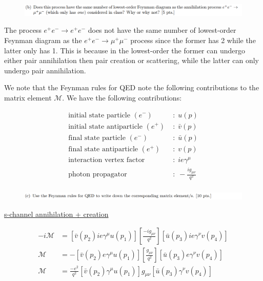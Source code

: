 \documentclass[11pt]{article}
\theoremstyle{definition}
\numberwithin{equation}{section}
\begin{document}
\newpage



\begin{figure}[H]
    \centering
    \includegraphics[scale = 0.4]{1b.png}
\end{figure}

The process $e^+e^- \to e^+e^-$ does not have the same number of lowest-order Feynman diagram as the $e^+e^- \to \mu^+\mu^-$ process since the former has 2 while the latter only has 1. This is because in the lowest-order the former can undergo either pair annihilation then pair creation or scattering, while the latter can only undergo pair annihilation.


\newpage


We note that the Feynman rules for QED note the following contributions to the matrix element $\mathcal{M}$. We have the following contributions:

\begin{align*}
    \text{initial state particle }(e^{-}) \; &: \; u(p)\\
    \text{initial state antiparticle }(e^{+}) \; &: \; \bar{v}(p)\\
    \text{final state particle }(e^{-}) \; &: \; \bar{u}(p)\\
    \text{final state antiparticle }(e^{+}) \; &: \; v(p)\\
    \text{interaction vertex factor } \; &: \; ie\gamma^{\mu}\\
    \text{photon propagator} \; &: \; -\frac{ig_{\mu\nu}}{q^2}\\
\end{align*}


\begin{figure}[H]
    \centering
    \includegraphics[scale = 0.4]{1c.png}
\end{figure}

\underline{s-channel annihilation + creation}

\begin{align}
    -i\mathcal{M} &= [\bar{v}(p_2)ie\gamma^{\mu}u(p_1)] 
    \left[ \frac{-ig_{\mu\nu}}{q^2} \right]
    [\bar{u}(p_3)ie\gamma^{\nu}v(p_4)]\\
    \mathcal{M} &= -[\bar{v}(p_2)e\gamma^{\mu}u(p_1)] 
    \left[ \frac{g_{\mu\nu}}{q^2} \right]
    [\bar{u}(p_3)e\gamma^{\nu}v(p_4)]\\
    \mathcal{M} &= \frac{-e^2}{q^2} [\bar{v}(p_2)\gamma^{\mu}u(p_1)]
    g_{\mu\nu}[\bar{u}(p_3)\gamma^{\nu}v(p_4)]\\
\end{align}
\end{document}
